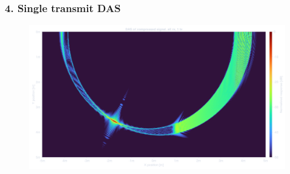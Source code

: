 \documentclass[compress,aspectratio=169]{beamer}
\begin{document}
\begin{frame} %
    \frametitle{4. Single transmit DAS}
    \begin{figure}
        \includegraphics[width=0.9\columnwidth]{"../7.png"}
    \end{figure}
\end{frame} %
\end{document}
